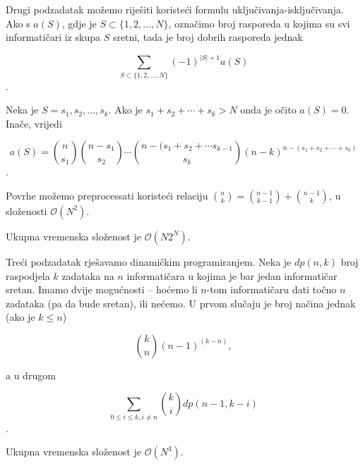 \documentclass[a4paper]{article}
\begin{document}
Drugi podzadatak možemo riješiti koristeći formulu uključivanja-isključivanja.
Ako s $a(S)$, gdje je $S \subset \{1, 2, \ldots, N\}$, označimo broj rasporeda
u kojima su svi informatičari iz skupa $S$ sretni, tada je broj dobrih
rasporeda jednak

$$\sum_{S \subset \{1, 2, \ldots, N\}} (-1)^{|S| + 1} a(S)$$.

Neka je $S = {s_1, s_2, \ldots, s_k}$. Ako je $s_1 + s_2 + \cdots + s_k > N$
onda je očito $a(S) = 0$. Inače, vrijedi 

$$a(S) = \binom{n}{s_1} \binom{n - s_1}{s_2} \cdots \binom{n - (s_1 + s_2 +
\cdots s_{k-1}}{s_k} (n - k)^{n - (s_1 + s_2 + \cdots + s_k)}$$.

Povrhe možemo preprocessati koristeći relaciju $\binom{n}{k} = \binom{n - 1}{k
- 1} + \binom{n - 1}{k}$, u složenosti $\mathcal{O}(N^2)$.

Ukupna vremenska složenost je $\mathcal{O}(N 2^N)$.

Treći podzadatak rješavamo dinamičkim programiranjem. Neka je $dp(n, k)$ broj
raspodjela $k$ zadataka na $n$ informatičara u kojima je bar jedan informatičar
sretan. Imamo dvije mogućnosti -- hoćemo li $n$-tom informatičaru dati točno $n$
zadataka (pa da bude sretan), ili nećemo. U prvom slučaju je broj načina jednak
(ako je $k \leq n$)

$$\binom{k}{n} (n - 1)^{(k - n)},$$

a u drugom

$$\sum_{0 \leq i \leq k, i \neq n} \binom{k}{i} dp(n - 1, k - i)$$.

Ukupna vremenska složenost je $\mathcal{O}(N^3)$.
\end{document}
